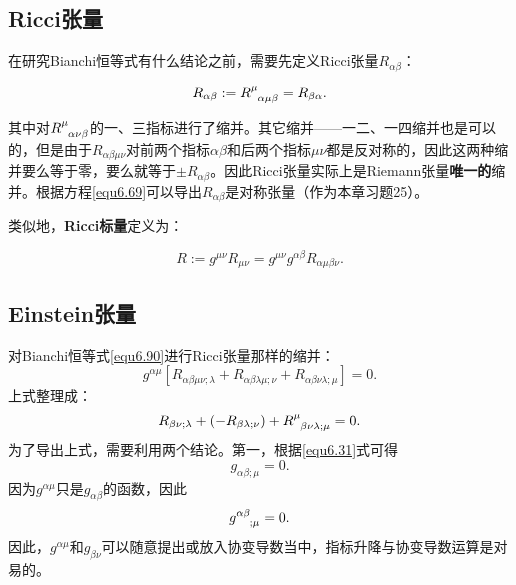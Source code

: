 \subsection*{Ricci张量}
在研究Bianchi恒等式有什么结论之前，需要先定义Ricci张量$R_{\alpha \beta}$：
\begin{shaded}
\begin{equation}
    R_{\alpha \beta} := R\indices{^\mu_{\alpha \mu \beta}} = R_{\beta \alpha}.
\label{equ6.91}
\end{equation}
\end{shaded}
其中对$R\indices{^\mu_{\alpha \nu \beta}}$的一、三指标进行了缩并。其它缩并——一二、一四缩并也是可以的，但是由于$R_{\alpha \beta \mu \nu}$对前两个指标$\alpha \beta$和后两个指标$\mu \nu$都是反对称的，因此这两种缩并要么等于零，要么就等于$\pm R_{\alpha \beta}$。因此Ricci张量实际上是Riemann张量\textbf{唯一的}缩并。根据方程\eqref{equ6.69}可以导出$R_{\alpha \beta}$是对称张量（作为本章习题25）。

类似地，\textbf{Ricci标量}定义为：
\begin{shaded}
\begin{equation}
    R := g^{\mu \nu} R_{\mu \nu} = g^{\mu \nu} g^{\alpha \beta} R_{\alpha \mu \beta \nu}.
\label{equ6.92}
\end{equation}
\end{shaded}

\subsection*{Einstein张量}
对Bianchi恒等式\eqref{equ6.90}进行Ricci张量那样的缩并：
\begin{equation*}
    g^{\alpha \mu} [R_{\alpha \beta \mu \nu; \lambda} + R_{\alpha \beta \lambda \mu; \nu} + R_{\alpha \beta \nu \lambda; \mu}] = 0.
\end{equation*}
上式整理成：
\begin{equation}
    R_{\beta \nu; \lambda} + (- R_{\beta \lambda; \nu} ) + R\indices{^\mu_{\beta \nu \lambda; \mu}} = 0.
\label{equ6.93}
\end{equation}
为了导出上式，需要利用两个结论。第一，根据\eqref{equ6.31}式可得
\begin{equation*}
    g_{\alpha \beta; \mu} = 0.
\end{equation*}
因为$g^{\alpha \mu}$只是$g_{\alpha \beta}$的函数，因此
\begin{equation}
    g\indices{^{\alpha \beta}_{; \mu}} = 0.
\label{equ6.94}
\end{equation}
因此，$g^{\alpha \mu}$和$g_{\beta \nu}$可以随意提出或放入协变导数当中，指标升降与协变导数运算是对易的。


